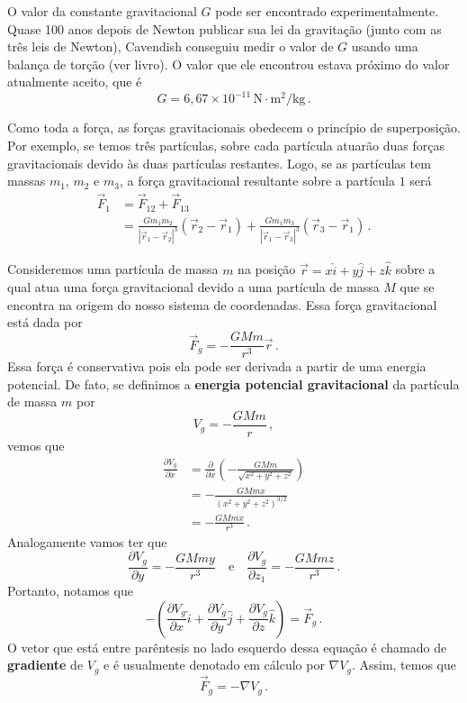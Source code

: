 \documentclass[twocolumn=on,fontsize=12pt,DIV=calc]{scrartcl}
\newcommand{\dpar}[1]{\left(#1\right)}
\theoremstyle{definition}
\begin{document}
O valor da constante gravitacional $G$ pode ser encontrado
experimentalmente. Quase 100 anos depois de Newton publicar sua lei da
gravitação (junto com as três leis de Newton), Cavendish conseguiu
medir o valor de $G$ usando uma balança de torção (ver livro). O valor
que ele encontrou estava próximo do valor atualmente aceito, que é
$$G=6{,}67\times 10^{-11}\,\mathrm{N}\cdot\mathrm{m}^2/\mathrm{kg}\,.$$

Como toda a força, as forças gravitacionais obedecem o princípio de
superposição. Por exemplo, se temos três partículas, sobre cada
partícula atuarão duas forças gravitacionais devido às duas partículas
restantes. Logo, se as partículas tem massas $m_1$, $m_2$ e $m_3$, a
força gravitacional resultante sobre a partícula $1$ será
\begin{equation*}
  \begin{split}
    \vec F_1&=\vec F_{12}+\vec F_{13}\\
    &=\frac{Gm_1m_2}{|\vec r_1-\vec r_2|^3}(\vec r_2-\vec
    r_1)+\frac{Gm_1m_3}{|\vec r_1-\vec r_3|^3}(\vec r_3-\vec r_1)\,.
  \end{split}
\end{equation*}

Consideremos uma partícula de massa $m$ na posição
$\vec r=x\hat i+y\hat j+z\hat k$ sobre a qual atua uma força
gravitacional devido a uma partícula de massa $M$ que se encontra na
origem do nosso sistema de coordenadas. Essa força gravitacional está
dada por
$$\vec F_g=-\frac{GMm}{r^3}\vec r\,.$$
Essa força é conservativa pois ela pode ser derivada a partir de uma
energia potencial. De fato, se definimos a \textbf{energia potencial
  gravitacional} da partícula de massa $m$ por
\begin{equation}
  \label{eq:10}
  V_g=-\frac{GMm}{r}\,,
\end{equation}
vemos que
\begin{equation*}
  \begin{split}
    \frac{\partial V_g}{\partial x}&=\frac{\partial}{\partial x}\dpar{-\frac{GMm}{\sqrt{x^2+y^2+z^2}}}\\
    &=-\frac{GMmx}{(x^2+y^2+z^2)^{3/2}}\\
    &=-\frac{GMmx}{r^3}\,.
  \end{split}
\end{equation*}
Analogamente vamos ter que
$$\frac{\partial V_g}{\partial y}=-\frac{GMmy}{r^3}\quad\text{e}\quad\frac{\partial V_g}{\partial z_1}=-\frac{GMmz}{r^3}\,.$$
Portanto, notamos que
$$-\dpar{\frac{\partial V_g}{\partial x}\hat i+\frac{\partial V_g}{\partial y}\hat j+\frac{\partial V_g}{\partial z}\hat k}=\vec F_g\,.$$
O vetor que está entre parêntesis no lado esquerdo dessa equação é
chamado de \textbf{gradiente} de $V_g$ e é usualmente denotado em
cálculo por $\nabla V_g$. Assim, temos que
\begin{equation}
  \label{eq:11}
  \vec F_g=-\nabla V_g\,.
\end{equation}
\end{document}
